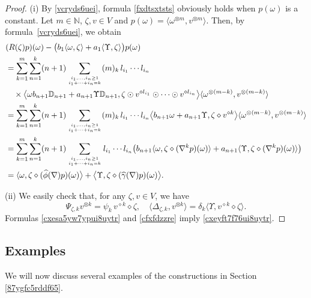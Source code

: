 \documentclass[12pt]{article}
\theoremstyle{remark}
\theoremstyle{remark}
\theoremstyle{remark}
\begin{document}
\begin{proof} 
(i) By \eqref{vcryds6uei}, formula \eqref{fxdtsxtsts} obviously holds when $p(\omega)$ is a constant. 
Let $m\in\mathbb N$, $\zeta,v\in V$ and $p(\omega)=\langle\omega^{\otimes m},v^{\otimes m}\rangle$. Then, by formula~\eqref{vcryds6uei}, we obtain
\begin{align*}
&(R(\zeta)p)(\omega)-\big(b_1\langle\omega,\zeta\rangle +a_1\langle\Upsilon,\zeta\rangle\big)p(\omega)\\
&=\sum_{k=1}^m\sum_{n=1}^k(n+1) \sum_{i_1,\dots,i_n \geq 1 \atop i_1+\dots+i_n=k} (m)_k\,
l_{i_1}\dotsm l_{i_n}\\
&\quad\times
\big\langle \omega b_{n+1}\mathbb D_{n+1}+a_{n+1}\Upsilon\mathbb D_{n+1}, \zeta\odot v^{\diamond l_{i_1}}\odot\dotsm\odot v^{\diamond l_{i_n}}    \big\rangle\langle\omega^{\otimes(m-k)},v^{\otimes(m-k)}\rangle\\
& =\sum_{k=1}^m\sum_{n=1}^k(n+1) \sum_{i_1,\dots,i_n \geq 1 \atop i_1+\dots+i_n=k} (m)_k\,
l_{i_1}\dotsm l_{i_n}%
\big\langle b_{n+1}\omega +a_{n+1}\Upsilon, \zeta\diamond  v^{\diamond k}    \big\rangle\langle\omega^{\otimes(m-k)},v^{\otimes(m-k)}\rangle\\
& =\sum_{k=1}^m\sum_{n=1}^k(n+1) \sum_{i_1,\dots,i_n \geq 1 \atop i_1+\dots+i_n=k} 
l_{i_1}\dotsm l_{i_n}
\big( b_{n+1}\langle \omega,\zeta\diamond(\nabla^kp)(\omega)\rangle+a_{n+1}\langle\Upsilon,\zeta\diamond(\nabla^kp)(\omega)\rangle\big)\\
&=\langle\omega, \zeta\diamond (\widehat\phi(\nabla)p)(\omega)\big\rangle+ \big\langle\Upsilon,\zeta\diamond(\widehat\gamma(\nabla)p)(\omega)\big\rangle.
\end{align*}

(ii) We easily check that, for any $\zeta,v\in V$, we have 
\begin{equation}\Psi_{\zeta,k}v^{\otimes k}=\psi_k\, v^{\diamond k}\diamond \zeta,\quad
\langle \Delta_{\zeta,k},v^{\otimes k}\rangle=\delta_k\langle\Upsilon, v^{\diamond k}\diamond \zeta\rangle. 
\label{cfxfdzzre}
\end{equation}
Formulas \eqref{cxesa5yw7ypui8uytr} and \eqref{cfxfdzzre} imply \eqref{cxeyft7f76ui8uytr}. 
\end{proof}


\subsection{Examples}

We will now discuss several examples of the constructions in  Section \ref{87ygfc5rddf65}. 
\end{document}
